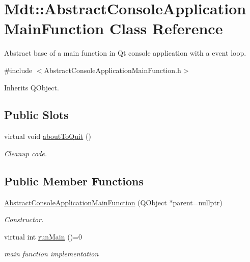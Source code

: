 \hypertarget{class_mdt_1_1_abstract_console_application_main_function}{}\section{Mdt\+:\+:Abstract\+Console\+Application\+Main\+Function Class Reference}
\label{class_mdt_1_1_abstract_console_application_main_function}


Abstract base of a main function in Qt console application with a event loop.  




{\ttfamily \#include $<$Abstract\+Console\+Application\+Main\+Function.\+h$>$}



Inherits Q\+Object.

\subsection*{Public Slots}
\begin{DoxyCompactItemize}
\item 
virtual void \hyperlink{class_mdt_1_1_abstract_console_application_main_function_a7f00b12d06e341d037cd1a69632b2ac2}{about\+To\+Quit} ()
\begin{DoxyCompactList}\small\item\em Cleanup code. \end{DoxyCompactList}\end{DoxyCompactItemize}
\subsection*{Public Member Functions}
\begin{DoxyCompactItemize}
\item 
\hyperlink{class_mdt_1_1_abstract_console_application_main_function_aec80aaecedd4a2d6696878b96cfc9b40}{Abstract\+Console\+Application\+Main\+Function} (Q\+Object $\ast$parent=nullptr)\hypertarget{class_mdt_1_1_abstract_console_application_main_function_aec80aaecedd4a2d6696878b96cfc9b40}{}\label{class_mdt_1_1_abstract_console_application_main_function_aec80aaecedd4a2d6696878b96cfc9b40}

\begin{DoxyCompactList}\small\item\em Constructor. \end{DoxyCompactList}\item 
virtual int \hyperlink{class_mdt_1_1_abstract_console_application_main_function_a34213b6ac2188b3620f5c2f5ce4ee287}{run\+Main} ()=0\hypertarget{class_mdt_1_1_abstract_console_application_main_function_a34213b6ac2188b3620f5c2f5ce4ee287}{}\label{class_mdt_1_1_abstract_console_application_main_function_a34213b6ac2188b3620f5c2f5ce4ee287}

\begin{DoxyCompactList}\small\item\em main function implementation \end{DoxyCompactList}\end{DoxyCompactItemize}

